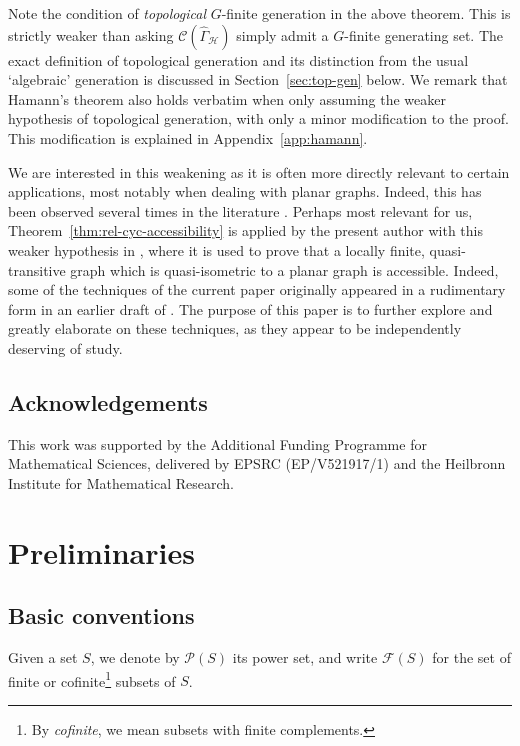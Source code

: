 \documentclass[11pt,a4paper]{amsart}
\theoremstyle{definition}
\newcommand{\per}{\mathcal{H}}
\newcommand{\cyc}{\mathscr{C}}
\begin{document}
Note the condition of \emph{topological} $G$-finite generation in the above theorem. This is strictly weaker than asking ${\cyc(\widehat\Gamma_\per)}$ simply admit a $G$-finite generating set. The exact definition of topological generation and its distinction from the usual `algebraic' generation is discussed in Section~\ref{sec:top-gen} below. We remark that Hamann's theorem also holds verbatim when only assuming the weaker hypothesis of topological generation, with only a minor modification to the proof. This modification is explained in Appendix~\ref{app:hamann}. 

We are interested in this weakening as it is often more directly relevant to certain applications, most notably when dealing with planar graphs. Indeed, this has been observed several times in the literature \cites{dunwoody2007planar,groves1991remarks}. Perhaps most relevant for us, Theorem~\ref{thm:rel-cyc-accessibility} is applied by the present author with this weaker hypothesis in \cite{macmanus2023accessibility}, where it is used to prove that a locally finite, quasi-transitive graph which is quasi-isometric to a planar graph is accessible. Indeed, some of the techniques of the current paper originally appeared in a rudimentary form in an earlier draft of \cite{macmanus2023accessibility}. The purpose of this paper is to further explore and greatly elaborate on these techniques, as they appear to be independently deserving of study. 

\subsection*{Acknowledgements}

This work was supported by the Additional Funding Programme for Mathematical Sciences, delivered by EPSRC (EP/V521917/1) and the Heilbronn Institute for Mathematical Research.



\section{Preliminaries}

\subsection{Basic conventions}


Given a set $S$, we denote by $\mathscr P(S)$ its power set, and write $\mathscr F(S)$ for the set of finite or cofinite\footnote{By \textit{cofinite}, we mean subsets with finite complements.} subsets of $S$.
\end{document}
